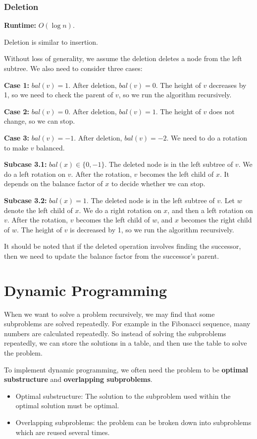 \documentclass[a4paper,12pt]{article}
\begin{document}
\subsubsection{Deletion}

\textbf{Runtime:}
$O(\log n)$.

Deletion is similar to insertion.

Without loss of generality, we assume the deletion deletes a node from the left subtree.
We also need to consider three cases:

\textbf{Case 1:}
$bal(v) = 1$.
After deletion, $bal(v) = 0$.
The height of $v$ decreases by 1, so we need to check the parent of $v$, so we run the algorithm recursively.

\textbf{Case 2:}
$bal(v) = 0$.
After deletion, $bal(v) = 1$.
The height of $v$ does not change, so we can stop.

\textbf{Case 3:}
$bal(v) = -1$.
After deletion, $bal(v) = -2$.
We need to do a rotation to make $v$ balanced.

\textbf{Subcase 3.1:}
$bal(x) \in \{0, -1\}$.
The deleted node is in the left subtree of $v$.
We do a left rotation on $v$.
After the rotation, $v$ becomes the left child of $x$.
It depends on the balance factor of $x$ to decide whether we can stop.

\textbf{Subcase 3.2:}
$bal(x) = 1$.
The deleted node is in the left subtree of $v$.
Let $w$ denote the left child of $x$.
We do a right rotation on $x$, and then a left rotation on $v$.
After the rotation, $v$ becomes the left child of $w$, and $x$ becomes the right child of $w$.
The height of $v$ is decreased by 1, so we run the algorithm recursively.

\vspace{1cm}
It should be noted that if the deleted operation involves finding the successor, then we need to update the balance factor from the successor's parent.

\section{Dynamic Programming}

When we want to solve a problem recursively, we may find that some subproblems are solved repeatedly.
For example in the Fibonacci sequence, many numbers are calculated repeatedly.
So instead of solving the subproblems repeatedly, we can store the solutions in a table, and then use the table to solve the problem.

To implement dynamic programming, we often need the problem to be \textbf{optimal substructure} and \textbf{overlapping subproblems}.
\begin{itemize}
	\item Optimal substructure: The solution to the subproblem used within the optimal solution must be optimal.
	\item Overlapping subproblems: the problem can be broken down into subproblems which are reused several times.
\end{itemize}
\end{document}
